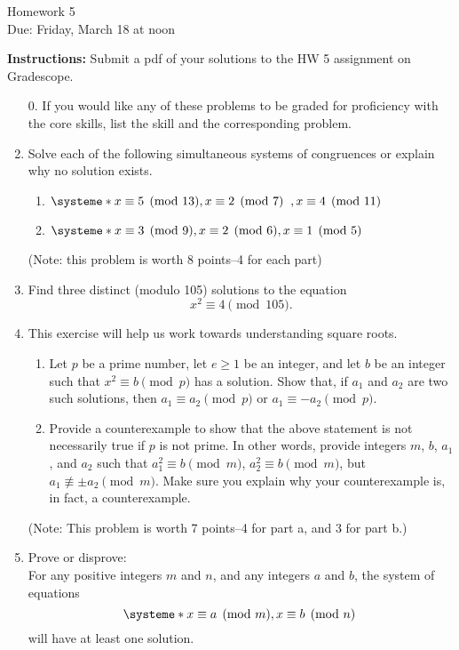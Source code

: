 \documentclass[12pt]{article}
\begin{document}
\begin{center}
{\Large Homework 5}\\
Due: Friday,  March 18 at noon\\


\end{center}
{\bf Instructions:} Submit a pdf of your solutions to the HW 5 assignment on Gradescope. 



\begin{enumerate}
\item[0.] If you would like any of these problems to be graded for proficiency with the core skills, list the skill and the corresponding problem. 
\item Solve each of the following simultaneous systems of congruences or explain
why no solution exists.
\begin{enumerate}
\item $\systeme*{x\equiv 5\pmod{13}, x\equiv 2\pmod{7}\;\;, x\equiv 4 \pmod{11}}$
\item $\systeme*{x\equiv 3\pmod{9}, x\equiv 2\pmod 6, x\equiv 1\pmod{5}}$
\end{enumerate}
(Note: this problem is worth 8 points--4 for each part)
   
\item Find three distinct (modulo 105) solutions to the equation $$x^2\equiv 4\pmod{105}.$$
\item This exercise will help us work towards understanding square roots. 
\begin{enumerate}
\item Let $p$ be a prime number, let $e\ge 1$ be an integer, and let $b$ be an integer such that $x^2\equiv b\pmod{p}$ has a solution.  Show that,  if $a_1$ and $a_2$ are two such solutions, then $a_1\equiv a_2\pmod{p}$ or $a_1\equiv -a_2\pmod{p}$. 
\item Provide a counterexample to show that the above statement is not necessarily true if $p$ is not prime. In other words, provide integers $m$, $b$, $a_1$, and $a_2$ such that $a_1^2\equiv b\pmod{m}$, $a_2^2\equiv b\pmod{m}$, but $a_1\not \equiv \pm a_2 \pmod{m}$. Make sure you explain why your counterexample is, in fact, a counterexample. 
\end{enumerate}
(Note: This problem is worth 7 points--4 for part a, and 3 for part b.)
\item Prove or disprove:\\ For any positive integers $m$ and $n$,  and any integers $a$ and $b$, the system of equations $$\systeme*{x\equiv a\pmod{m},  x\equiv b\pmod{n}\;}$$
  will have at least one solution. 
\end{enumerate}
\end{document}
